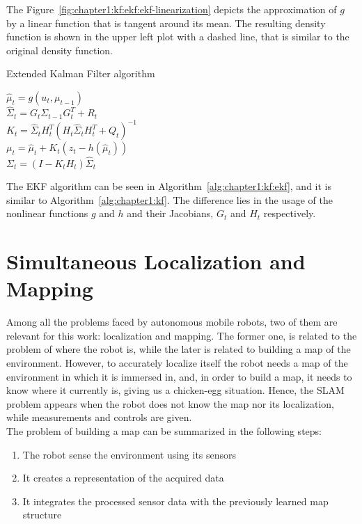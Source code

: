 The Figure~\ref{fig:chapter1:kf:ekf:ekf-linearization} depicts the approximation of $g$ by a linear function that is tangent around its mean. The resulting density function is shown in the upper left plot with a dashed line, that is similar to the original density function.\\

\begin{algorithm}[h]
    \caption{Extended Kalman Filter algorithm}
    \label{alg:chapter1:kf:ekf}

    \BlankLine
    \BlankLine
    $\hat\mu_t = g \left(u_t, \mu_{t-1}\right)$ \\
    $\hat\Sigma_t = G_t \Sigma_{t-1} G_t^T + R_t$ \\
    \BlankLine
    $K_t = \hat\Sigma_t H_t^T \left(H_t \hat\Sigma_t H_t^T + Q_t\right)^{-1}$ \\
    $\mu_t = \hat\mu_t + K_t \left(z_t - h \left(\hat\mu_t\right) \right) $ \\
    $\Sigma_t = (I - K_t H_t) \hat\Sigma_t$ \\
    \BlankLine
\end{algorithm}

The EKF algorithm can be seen in Algorithm~\ref{alg:chapter1:kf:ekf}, and it is similar to Algorithm~\ref{alg:chapter1:kf}. The difference lies in the usage of the nonlinear functions $g$ and $h$ and their Jacobians, $G_t$ and $H_t$ respectively.

\section{Simultaneous Localization and Mapping}
\label{sec:chapter1:slam}
Among all the problems faced by autonomous mobile robots, two of them are relevant for this work: localization and mapping. The former one, is related to the problem of where the robot is, while the later is related to building a map of the environment. However, to accurately localize itself the robot needs a map of the environment in which it is immersed in, and, in order to build a map, it needs to know where it currently is, giving us a chicken-egg situation. Hence, the \ac{SLAM} problem appears when the robot does not know the map nor its localization, while measurements and controls are given.\\

The problem of building a map can be summarized in the following steps:
\begin{enumerate}
    \item{The robot sense the environment using its sensors}
    \item{It creates a representation of the acquired data}
    \item{It integrates the processed sensor data with the previously learned map structure}
\end{enumerate}

